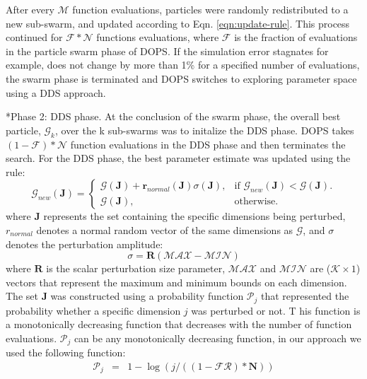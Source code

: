 \documentclass[12pt]{article}
\makeatletter
\renewcommand\subsubsection{\@startsection
	{subsubsection}{2}{0mm}
	{-0.05in}
	{-0.5\baselineskip}
	{\normalfont\normalsize\itshape}}
\makeatother
\begin{document}
After every $\mathcal{M}$ function evaluations, particles were randomly redistributed to a new sub-swarm, and updated according to Eqn. \eqref{eqn:update-rule}.
This process continued for $\mathcal{F}*\mathcal{N}$ functions evaluations, where $\mathcal{F}$ is the fraction of evaluations in the particle swarm phase of DOPS.
If the simulation error stagnates for example, does not change by more than 1\% for a specified number of evaluations, the swarm phase is terminated and DOPS switches to
exploring parameter space using a DDS approach.

\subsubsection*{Phase 2: DDS phase.}
At the conclusion of the swarm phase, the overall best particle, $\mathcal{G}_{k}$, over the k sub-swarms was to initalize the DDS phase.
DOPS takes $\left(1-\mathcal{F}\right)*\mathcal{N}$ function evaluations in the DDS phase and then terminates the search.
For the DDS phase, the best parameter estimate was updated using the rule:
\begin{equation}
  \mathcal{G}_{new}(\mathbf{J})=\begin{cases}
    \mathcal{G}(\mathbf{J})+\mathbf{r}_{normal}(\mathbf{J})\sigma(\mathbf{J}), & \text{if $\mathcal{G}_{new}(\mathbf{J})<\mathcal{G}(\mathbf{J})$}.\\
    \mathcal{G}(\mathbf{J}), & \text{otherwise}.
  \end{cases}
\end{equation}
where $\mathbf{J}$ represents the set containing the specific dimensions being perturbed, ${r}_{normal}$ denotes a normal random vector of the same dimensions as $\mathcal{G}$,
and $\sigma$ denotes the perturbation amplitude:
\begin{equation}
	\sigma = \mathbf{R}(\mathcal{MAX} -\mathcal{MIN})
\end{equation}
where $\mathbf{R}$ is the scalar perturbation size parameter, $\mathcal{MAX}$ and $\mathcal{MIN}$ are ($\mathcal{K}\times{1}$) vectors that represent the maximum and minimum bounds on each dimension. The set $\mathbf{J}$ was constructed using a probability function $\mathcal{P}_{j}$ that represented the probability whether a specific dimension $j$ was perturbed or not.  T
his function is a monotonically decreasing function that decreases with the number of function evaluations. $\mathcal{P}_{j}$ can be any monotonically decreasing function, in our approach we used the following function:
\begin{eqnarray}
	\mathcal{P}_{j}&=&{1}-\log(j/ (({1}-\mathcal{FR})*\mathbf{N}))
\end{eqnarray}
\end{document}
